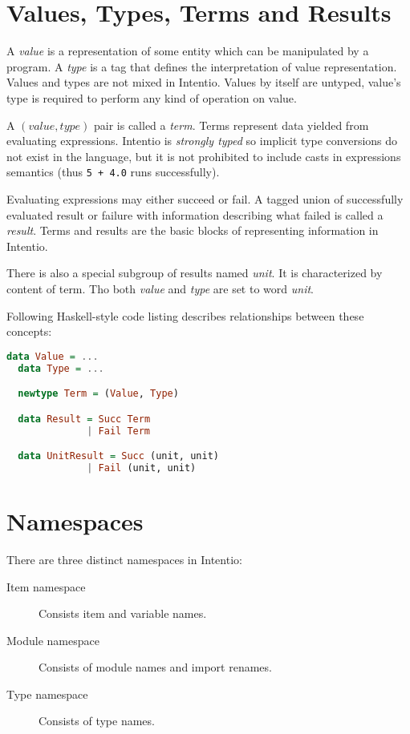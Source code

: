 \section{Values, Types, Terms and Results}

A \emph{value} is a representation of some entity which can be manipulated by a program. A \emph{type} is a tag that defines the interpretation of value representation. Values and types are not mixed in Intentio. Values by itself are untyped, value's type is required to perform any kind of operation on value.

A \((value, type)\) pair is called a \emph{term}. Terms represent data yielded from evaluating expressions. Intentio is \emph{strongly typed} so implicit type conversions do not exist in the language, but it is not prohibited to include casts in expressions semantics (thus \lstinline{5 + 4.0} runs successfully).

Evaluating expressions may either succeed or fail. A tagged union of successfully evaluated result or failure with information describing what failed is called a \emph{result}. Terms and results are the basic blocks of representing information in Intentio.

There is also a special subgroup of results named  \emph{unit}. It is characterized by content of term. Tho both \emph{value} and \emph{type} are set to word \emph{unit}.

Following Haskell-style code listing describes relationships between these concepts:

\begin{lstlisting}[language=Haskell]
  data Value = ...
  data Type = ...

  newtype Term = (Value, Type)

  data Result = Succ Term
              | Fail Term

  data UnitResult = Succ (unit, unit)
              | Fail (unit, unit)
\end{lstlisting}


\section{Namespaces}

There are three distinct namespaces in Intentio:

\begin{description}
  \item [Item namespace] Consists item and variable names.
  \item [Module namespace] Consists of module names and import renames.
  \item [Type namespace] Consists of type names.
\end{description}

